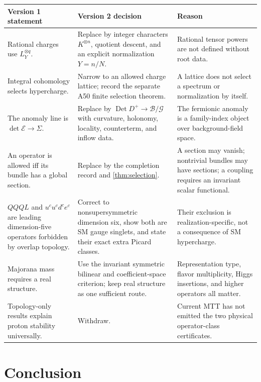 \documentclass[11pt]{article}
\newcommand{\Det}{\operatorname{Det}}
\newcommand{\Bkg}{\mathcal{B}}
\newcommand{\GaugeGrp}{\mathcal{G}}
\begin{document}
\begin{table}[ht]
\centering
\small
\begin{tabularx}{\textwidth}{@{}P{0.28\textwidth}YY@{}}
\toprule
Version 1 statement & Version 2 decision & Reason \\
\midrule
Rational charges use \(L_Y^{\otimes q}\). &
Replace by integer characters \(K^{\otimes n}\), quotient descent, and an
explicit normalization \(Y=n/N\). &
Rational tensor powers are not defined without root data.\\
\addlinespace
Integral cohomology selects hypercharge. &
Narrow to an allowed charge lattice; record the separate A50 finite
selection theorem. &
A lattice does not select a spectrum or normalization by itself.\\
\addlinespace
The anomaly line is \(\det\mathcal E\to\Sigma\). &
Replace by \(\Det D^+\to\Bkg/\GaugeGrp\) with curvature, holonomy, locality,
counterterm, and inflow data. &
The fermionic anomaly is a family-index object over background-field space.\\
\addlinespace
An operator is allowed iff its bundle has a global section. &
Replace by the completion record and \cref{thm:selection}. &
A section may vanish; nontrivial bundles may have sections; a coupling
requires an invariant scalar functional.\\
\addlinespace
\(QQQL\) and \(u^cu^cd^ce^c\) are leading dimension-five operators
forbidden by overlap topology. &
Correct to nonsupersymmetric dimension six, show both are SM gauge singlets,
and state their exact extra Picard classes. &
Their exclusion is realization-specific, not a consequence of SM
hypercharge.\\
\addlinespace
Majorana mass requires a real structure. &
Use the invariant symmetric bilinear and coefficient-space criterion; keep
real structure as one sufficient route. &
Representation type, flavor multiplicity, Higgs insertions, and higher
operators all matter.\\
\addlinespace
Topology-only results explain proton stability universally. &
Withdraw. &
Current MTT has not emitted the two physical operator-class certificates.\\
\bottomrule
\end{tabularx}
\end{table}

\section{Conclusion}
\end{document}
